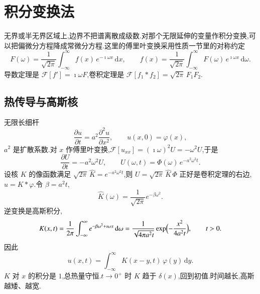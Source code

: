 \section{积分变换法}
无界或半无界区域上,边界不把谱离散成级数.对那个无限延伸的变量作积分变换,可以把偏微分方程降成常微分方程.这里的傅里叶变换采用性质一节里的对称约定
\begin{equation}
  F(\omega)=\frac{1}{\sqrt{2\pi}}\int_{-\infty}^{\infty} f(x)\,e^{-\imath\omega x}\,\mathrm{d}x,
  \qquad
  f(x)=\frac{1}{\sqrt{2\pi}}\int_{-\infty}^{\infty} F(\omega)\,e^{\imath\omega x}\,\mathrm{d}\omega.
\end{equation}
导数定理是 $\mathcal{F}[f']=\imath\omega F$,卷积定理是 $\mathcal{F}[f_1*f_2]=\sqrt{2\pi}\,F_1 F_2$.

\subsection{热传导与高斯核}
无限长细杆
\begin{equation}
  \frac{\partial u}{\partial t}=a^2\frac{\partial^2 u}{\partial x^2},
  \qquad
  u(x,0)=\varphi(x),
\end{equation}
$a^2$ 是扩散系数.对 $x$ 作傅里叶变换,$\mathcal{F}[u_{xx}]=(\imath\omega)^2 U=-\omega^2 U$,于是
\begin{equation}
  \frac{\partial U}{\partial t}=-a^2\omega^2 U,
  \qquad
  U(\omega,t)=\Phi(\omega)\,e^{-a^2\omega^2 t}.
\end{equation}
设核 $K$ 的像函数满足 $\sqrt{2\pi}\,\widehat K=e^{-a^2\omega^2 t}$,则 $U=\sqrt{2\pi}\,\widehat K\,\Phi$ 正好是卷积定理的右边,$u=K*\varphi$.令 $\beta=a^2 t$,
\begin{equation}
  \widehat K(\omega)=\frac{1}{\sqrt{2\pi}}e^{-\beta\omega^2}.
\end{equation}
逆变换是高斯积分,
\begin{equation}
  K(x,t)
  =\frac{1}{2\pi}\int_{-\infty}^{\infty} e^{-\beta\omega^2+\imath\omega x}\,\mathrm{d}\omega
  =\frac{1}{\sqrt{4\pi a^2 t}}
    \exp\Bigl(-\frac{x^2}{4a^2 t}\Bigr),
  \qquad t>0.
  \label{eq:heat-kernel}
\end{equation}
因此
\begin{equation}
  u(x,t)
  =\int_{-\infty}^{\infty} K(x-y,t)\,\varphi(y)\,\mathrm{d}y.
  \label{eq:heat-convolution}
\end{equation}
$K$ 对 $x$ 的积分是 $1$,总热量守恒.$t\to 0^+$ 时 $K$ 趋于 $\delta(x)$,回到初值.时间越长,高斯越矮、越宽.

